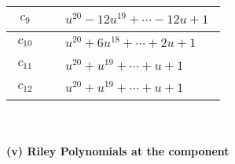 \documentclass[1p]{elsarticle_modified}
\theoremstyle{definition}
\begin{document}
\begin{tabular}{m{50pt}|m{274pt}}
\hline $$\begin{aligned}c_{9}\end{aligned}$$&$\begin{aligned}
&u^{20}-12 u^{19}+\cdots-12 u+1
\end{aligned}$\\
\hline $$\begin{aligned}c_{10}\end{aligned}$$&$\begin{aligned}
&u^{20}+6 u^{18}+\cdots+2 u+1
\end{aligned}$\\
\hline $$\begin{aligned}c_{11}\end{aligned}$$&$\begin{aligned}
&u^{20}+u^{19}+\cdots+u+1
\end{aligned}$\\
\hline $$\begin{aligned}c_{12}\end{aligned}$$&$\begin{aligned}
&u^{20}+u^{19}+\cdots+u+1
\end{aligned}$\\
\hline
\end{tabular}\\~\\
\newpage\renewcommand{\arraystretch}{1}
\flushleft \textbf{(v) Riley Polynomials at the component}\newline \\
\end{document}
